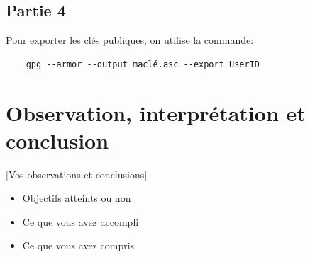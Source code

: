 \documentclass[12pt,a4paper]{article}
\begin{document}
\subsection{Partie 4}
Pour exporter les clés publiques, on utilise la commande:
\begin{verbatim}
    gpg --armor --output maclé.asc --export UserID
\end{verbatim}

\section{Observation, interprétation et conclusion}
 [Vos observations et conclusions]
\begin{itemize}
    \item Objectifs atteints ou non
    \item Ce que vous avez accompli
    \item Ce que vous avez compris
\end{itemize}
\end{document}
